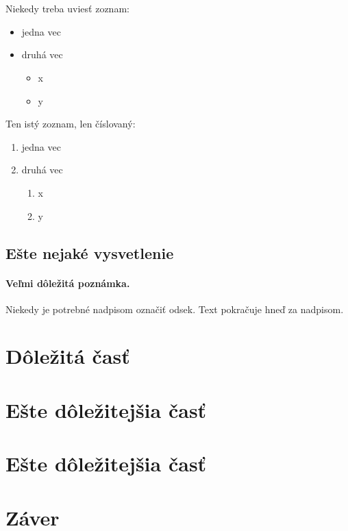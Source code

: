 \documentclass[10pt,twoside,slovak,a4paper]{article}
\begin{document}
\section{}

Niekedy treba uviesť zoznam:

\begin{itemize}
\item jedna vec
\item druhá vec
	\begin{itemize}
	\item x
	\item y
	\end{itemize}
\end{itemize}

Ten istý zoznam, len číslovaný:

\begin{enumerate}
\item jedna vec
\item druhá vec
	\begin{enumerate}
	\item x
	\item y
	\end{enumerate}
\end{enumerate}


\subsection{Ešte nejaké vysvetlenie} \label{ina:este}

\paragraph{Veľmi dôležitá poznámka.}
Niekedy je potrebné nadpisom označiť odsek. Text pokračuje hneď za nadpisom.



\section{Dôležitá časť} \label{dolezita}




\section{Ešte dôležitejšia časť} \label{dolezitejsia}



\section{Ešte dôležitejšia časť}



\section{Záver} \label{zaver} %






\end{document}
